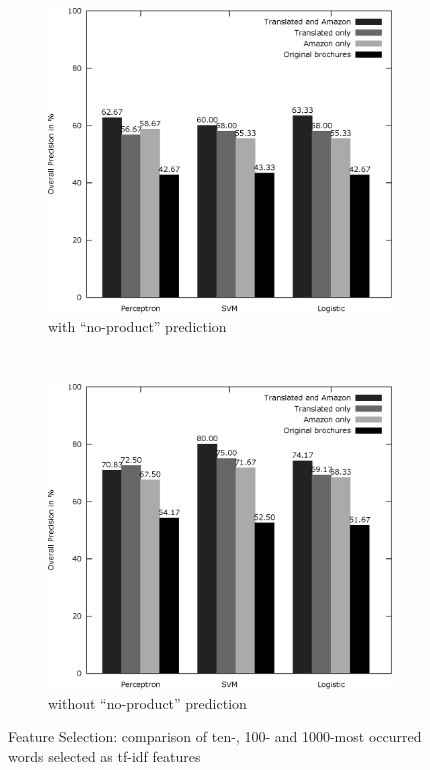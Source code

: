 
\begin{figure}
	\centering
	\begin{subfigure}[t]{0.5\textwidth}
		\includegraphics[width=\textwidth]{figures/product_translate_amazon_with_none.eps}
		\caption{with ``no-product'' prediction}
	\end{subfigure}~
	\begin{subfigure}[t]{0.5\textwidth}
		\includegraphics[width=\textwidth]{figures/product_translate_amazon_without_none.eps}
		\caption{without ``no-product'' prediction}
	\end{subfigure}
	\caption{Feature Selection: comparison of ten-, 100- and 1000-most occurred words selected as tf-idf features}
	\label{fig:product_translate_amazon}
\end{figure}

